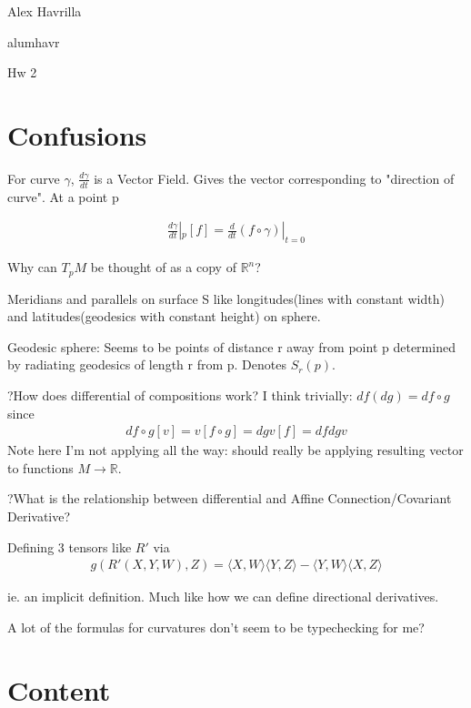 \documentclass[11pt]{article}
\newcommand{\R}{\mathbb{R}}
\newcommand{\myname}{Alex Havrilla}
\newcommand{\myandrew}{alumhavr}
\newcommand{\myhwnum}{Hw 2}
\begin{document}
\medskip                        

\thispagestyle{plain}
\begin{center}

{\myname}

\myandrew

\myhwnum

\end{center}

\section{Confusions}

For curve $\gamma$, $\frac{d\gamma}{dt}$ is a Vector Field. Gives the vector corresponding to "direction of curve". At a point p

\begin{align*}
	\frac{d\gamma}{dt}|_p[f] = \frac{d}{dt}(f \circ \gamma) |_{t = 0}
\end{align*}

Why can $T_pM$ be thought of as a copy of $\R^n$?

Meridians and parallels on surface S like longitudes(lines with constant width) and latitudes(geodesics with constant height) on sphere.

Geodesic sphere: Seems to be points of distance r away from point p determined by radiating geodesics of length r from p. Denotes $S_r(p)$. 

?How does differential of compositions work?
I think trivially: $df(dg) = d f\circ g$ since
\begin{align*}
	d f\circ g[v] = v[f\circ g] = dg v[f] = df dg v
\end{align*}
Note here I'm not applying all the way: should really be applying resulting vector to functions $M \to \R$. 

?What is the relationship between differential and Affine Connection/Covariant Derivative?

Defining 3 tensors like $R'$ via 
\begin{align*}
	g(R'(X,Y,W),Z) = \langle X,W\rangle\langle Y , Z \rangle - \langle Y,W\rangle \langle X,Z \rangle
\end{align*}

ie. an implicit definition. Much like how we can define directional derivatives.

A lot of the formulas for curvatures don't seem to be typechecking for me?

\section{Content}
\end{document}
